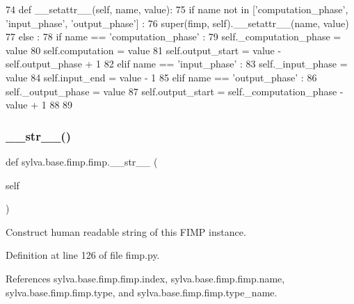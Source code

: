 \begin{DoxyCode}
74     \textcolor{keyword}{def }\_\_setattr\_\_(self, name, value):
75       \textcolor{keywordflow}{if} name \textcolor{keywordflow}{not} \textcolor{keywordflow}{in} [\textcolor{stringliteral}{'computation\_phase'}, \textcolor{stringliteral}{'input\_phase'}, \textcolor{stringliteral}{'output\_phase'}] :
76         super(fimp, self).\_\_setattr\_\_(name, value)
77       \textcolor{keywordflow}{else} :
78         \textcolor{keywordflow}{if} name == \textcolor{stringliteral}{'computation\_phase'} :
79           self.\_computation\_phase = value
80           self.computation = value
81           self.output\_start = value - self.output\_phase + 1
82         \textcolor{keywordflow}{elif} name == \textcolor{stringliteral}{'input\_phase'} :
83           self.\_input\_phase = value
84           self.input\_end = value - 1
85         \textcolor{keywordflow}{elif} name == \textcolor{stringliteral}{'output\_phase'} :
86           self.\_output\_phase = value
87           self.output\_start = self.\_computation\_phase - value + 1
88 
89 
\end{DoxyCode}
\mbox{\label{classsylva_1_1base_1_1fimp_1_1fimp_a0b3095642fa1f513c3efa52dc5780d6c}} 
\subsubsection{\texorpdfstring{\+\_\+\+\_\+str\+\_\+\+\_\+()}{\_\_str\_\_()}}
{\footnotesize\ttfamily def sylva.\+base.\+fimp.\+fimp.\+\_\+\+\_\+str\+\_\+\+\_\+ (\begin{DoxyParamCaption}\item[{}]{self }\end{DoxyParamCaption})}

\begin{DoxyVerb}  Construct human readable string of this FIMP instance.
\end{DoxyVerb}
 

Definition at line 126 of file fimp.\+py.



References sylva.\+base.\+fimp.\+fimp.\+index, sylva.\+base.\+fimp.\+fimp.\+name, sylva.\+base.\+fimp.\+fimp.\+type, and sylva.\+base.\+fimp.\+fimp.\+type\+\_\+name.




